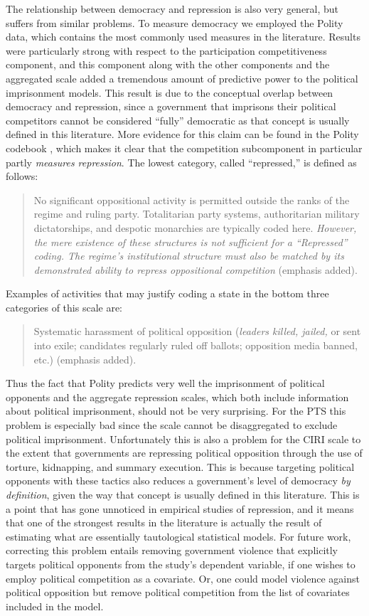 \documentclass[12pt]{article}
\begin{document}
The relationship between democracy and repression is also very general, but suffers from similar problems. To measure democracy we employed the Polity data, which contains the most commonly used measures in the literature. Results were particularly strong with respect to the participation competitiveness component, and this component along with the other components and the aggregated scale added a tremendous amount of predictive power to the political imprisonment models. This result is due to the conceptual overlap between democracy and repression, since a government that imprisons their political competitors cannot be considered ``fully'' democratic as that concept is usually defined in this literature. More evidence for this claim can be found in the Polity codebook \citep[][p.\ 26]{MarshallJaggers2009}, which makes it clear that the competition subcomponent in particular partly {\it measures repression}. The lowest category, called ``repressed,'' is defined as follows:
\begin{quote}
No significant oppositional activity is permitted outside the ranks of the regime and ruling party. Totalitarian party systems, authoritarian military dictatorships, and despotic monarchies are typically coded here. {\it However, the mere existence of these structures is not sufficient for a ``Repressed'' coding. The regime's institutional structure must also be matched by its demonstrated ability to repress oppositional competition} (emphasis added).
\end{quote}
\noindent
Examples of activities that may justify coding a state in the bottom three categories of this scale are:
\begin{quote}
Systematic harassment of political opposition ({\em leaders killed, jailed,} or sent into exile; candidates regularly ruled off ballots; opposition media banned, etc.) (emphasis added). 
\end{quote}
\noindent
Thus the fact that Polity predicts very well the imprisonment of political opponents and the aggregate repression scales, which both include information about political imprisonment, should not be very surprising. For the PTS this problem is especially bad since the scale cannot be disaggregated to exclude political imprisonment. Unfortunately this is also a problem for the CIRI scale to the extent that governments are repressing political opposition through the use of torture, kidnapping, and summary execution. This is because targeting political opponents with these tactics also reduces a government's level of democracy {\it by definition}, given the way that concept is usually defined in this literature. This is a point that has gone unnoticed in empirical studies of repression, and it means that one of the strongest results in the literature is actually the result of estimating what are essentially tautological statistical models. For future work, correcting this problem entails removing government violence that explicitly targets political opponents from the study's dependent variable, if one wishes to employ political competition as a covariate. Or, one could model violence against political opposition but remove political competition from the list of covariates included in the model. 
\end{document}
